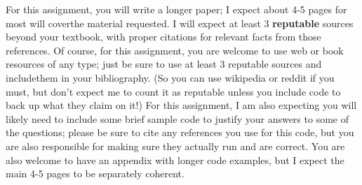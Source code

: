 \documentclass[11pt]{article}
\begin{document}
For this assignment, you will write a longer paper; I expect about 4-5 pages for most will coverthe material requested.  I will expect at least 3 {\bf reputable} sources beyond your textbook, with proper citations for relevant facts from those references.  Of course, for this assignment, you are welcome to use web or book resources of any type; just be sure to use at least 3 reputable sources and includethem in your bibliography.  (So you can use wikipedia or reddit if you must, but don’t expect me to  count  it  as  reputable  unless  you  include  code  to  back  up  what  they  claim  on  it!)   For  this assignment, I am also expecting you will likely need to include some brief sample code to justify your answers to some of the questions; please be sure to cite any references you use for this code, but you are also responsible for making sure they actually run and are correct.  You are also welcome to have an appendix with longer code examples, but I expect the main 4-5 pages to be separately coherent.
\end{document}
